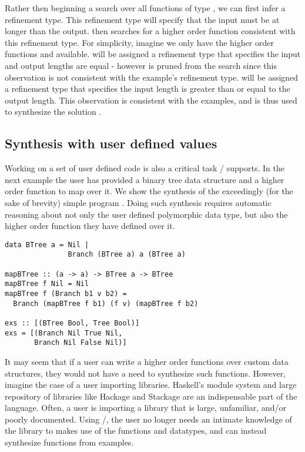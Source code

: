 Rather then beginning a search over all functions of type \codeinline{[Int] -> [Int]}, we can first infer a refinement type.
This refinement type will specify that the input must be at longer than the output.
\ourTool then searches for a higher order function consistent with this refinement type.
For simplicity, imagine we only have the higher order functions  and  available.
 will be assigned a refinement type that specifies the input and output lengths are equal - however is pruned from the search since this observation is not consistent with the example's refinement type.
 will be assigned a refinement type that specifies the input length is greater than or equal to the output length.
This observation is consistent with the examples, and is thus used to synthesize the solution .


\subsection{Synthesis with user defined values}

Working on a set of user defined code is also a critical task \ourTool/ supports. 
In the next example the user has provided a binary tree data structure and a higher order function to map over it. We show the synthesis of the exceedingly (for the sake of brevity) simple program .
Doing such synthesis requires automatic reasoning about not only the user defined polymorphic data type, but also the higher order function they have defined over it.

\begin{lstlisting}
data BTree a = Nil |
               Branch (BTree a) a (BTree a)

mapBTree :: (a -> a) -> BTree a -> BTree 
mapBTree f Nil = Nil
mapBTree f (Branch b1 v b2) = 
  Branch (mapBTree f b1) (f v) (mapBTree f b2)

exs :: [(BTree Bool, Tree Bool)]
exs = [(Branch Nil True Nil,
       Branch Nil False Nil)]
\end{lstlisting}

It may seem that if a user can write a higher order functions over custom data structures, they would not have a need to synthesize such functions.
However, imagine the case of a user importing libraries.
Haskell's module system and large repository of libraries like Hackage and Stackage are an indispensable part of the language\cite{hackage,stackage}.
Often, a user is importing a library that is large, unfamiliar, and/or poorly documented.
Using \ourTool/, the user no longer needs an intimate knowledge of the library to makes use of the functions and datatypes, and can instead synthesize functions from examples.


